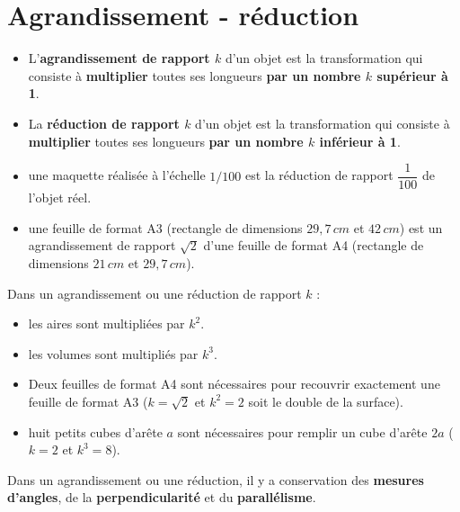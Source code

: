 \section{Agrandissement - réduction}
\begin{definition}
    \begin{itemize}
        \item L'{\bf agrandissement de rapport $k$} d'un objet est la transformation qui consiste à \textbf{multiplier} toutes ses longueurs \textbf{par un nombre $k$ supérieur à 1}.
        \item La {\bf réduction de rapport $k$} d'un objet est la transformation qui consiste à \textbf{multiplier} toutes ses longueurs \textbf{par un nombre $k$ inférieur à 1}.
    \end{itemize}
\end{definition}
\begin{exemple*1}
    \begin{itemize}
        \item une maquette réalisée à l'échelle $1/100$ est la réduction de rapport $\dfrac1{100}$ de l'objet réel.
        \item une feuille de format A3 (rectangle de dimensions $29,7\,cm$ et $42\,cm$) est un agrandissement de rapport $\sqrt2$ d'une feuille de format A4 (rectangle de dimensions $21\,cm$ et $29,7\,cm$).
    \end{itemize}
\end{exemple*1}
\begin{propriete}[\admise]
    Dans un agrandissement ou une réduction de rapport $k$ :
    \begin{itemize}
        \item les aires sont multipliées par $k^2$.
        \item les volumes sont multipliés par $k^3$.
    \end{itemize}
\end{propriete}
\begin{exemple*1}
    \begin{itemize}
        \item Deux feuilles de format A4 sont nécessaires pour recouvrir exactement une feuille de format A3 ($k=\sqrt2$ et $k^2=2$ soit le double de la surface).
        \item huit petits cubes d'arête $a$ sont nécessaires pour remplir un cube d'arête $2a$ ($k=2$ et $k^3=8$).
    \end{itemize}
\end{exemple*1}
\begin{propriete}[\admise]
    Dans un agrandissement ou une réduction, il y a conservation des \textbf{mesures d'angles}, de la \textbf{perpendicularité} et du \textbf{parallélisme}.
\end{propriete}
